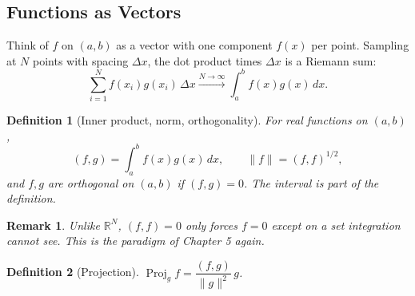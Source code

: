 \documentclass{article}
\newtheorem{definition}{Definition}
\newtheorem{remark}{Remark}
\newcommand{\R}{\mathbb{R}}
\begin{document}
\subsection{Functions as Vectors}
Think of $f$ on $(a,b)$ as a vector with one component $f(x)$ per point. Sampling at $N$ points with spacing $\Delta x$, the dot product times $\Delta x$ is a Riemann sum:
\begin{equation}
    \sum_{i=1}^N f(x_i)g(x_i)\,\Delta x \xrightarrow{N\to\infty} \int_a^b f(x)g(x)\,dx.
\end{equation}
\begin{definition}[Inner product, norm, orthogonality]
    For real functions on $(a,b)$,
    \begin{equation}
        (f,g) = \int_a^b f(x)g(x)\,dx, \qquad \|f\| = (f,f)^{1/2},
    \end{equation}
    and $f, g$ are orthogonal on $(a,b)$ if $(f,g) = 0$. The interval is part of the definition.
\end{definition}
\begin{remark}
    Unlike $\R^N$, $(f,f) = 0$ only forces $f = 0$ except on a set integration cannot see. This is the paradigm of Chapter 5 again.
\end{remark}
\begin{definition}[Projection]
    $\operatorname{Proj}_g f = \dfrac{(f,g)}{\|g\|^2}\,g$.
\end{definition}
\end{document}
